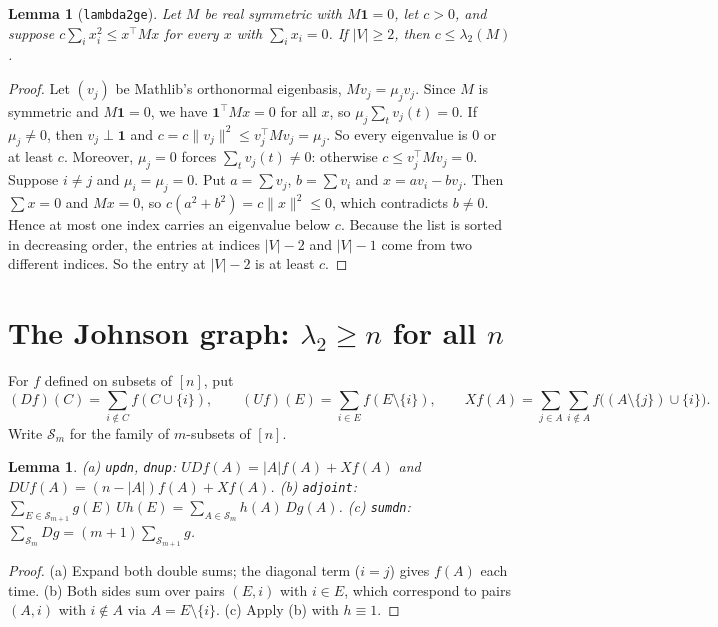 \documentclass[11pt]{article}
\newtheorem{lemma}[theorem]{Lemma}
\theoremstyle{definition}
\theoremstyle{remark}
\renewcommand{\_}{\oldus\allowbreak}
\begin{document}
\begin{lemma}[\texttt{lambda2\_ge}]\label{lem:var}
Let $M$ be real symmetric with $M\mathbf 1=0$, let $c>0$, and suppose $c\sum_i x_i^2\le x^\top Mx$ for
every $x$ with $\sum_i x_i=0$. If $|V|\ge 2$, then $c\le\lambda_2(M)$.
\end{lemma}
\begin{proof}
Let $(v_j)$ be Mathlib's orthonormal eigenbasis, $Mv_j=\mu_jv_j$. Since $M$ is symmetric and
$M\mathbf 1=0$, we have $\mathbf 1^\top Mx=0$ for all $x$, so $\mu_j\sum_t v_j(t)=0$. If $\mu_j\neq0$,
then $v_j\perp\mathbf 1$ and $c=c\|v_j\|^2\le v_j^\top Mv_j=\mu_j$. So every eigenvalue is $0$ or at
least $c$. Moreover, $\mu_j=0$ forces $\sum_t v_j(t)\ne0$: otherwise $c\le v_j^\top Mv_j=0$. Suppose
$i\ne j$ and $\mu_i=\mu_j=0$. Put $a=\sum v_j$, $b=\sum v_i$ and $x=av_i-bv_j$. Then $\sum x=0$ and
$Mx=0$, so $c(a^2+b^2)=c\|x\|^2\le0$, which contradicts $b\ne0$. Hence at most one index carries an
eigenvalue below $c$. Because the list is sorted in decreasing order, the entries at indices $|V|-2$
and $|V|-1$ come from two different indices. So the entry at $|V|-2$ is at least $c$.
\end{proof}

\section{The Johnson graph: $\lambda_2\ge n$ for all $n$}

For $f$ defined on subsets of $[n]$, put
\[(Df)(C)=\sum_{i\notin C}f(C\cup\{i\}),\qquad (Uf)(E)=\sum_{i\in E}f(E\setminus\{i\}),\qquad
X f(A)=\sum_{j\in A}\sum_{i\notin A}f\big((A\setminus\{j\})\cup\{i\}\big).\]
Write $\mathcal S_m$ for the family of $m$-subsets of $[n]$.

\begin{lemma}\label{lem:alg}
(a) \texttt{up\_dn}, \texttt{dn\_up}: $UDf(A)=|A|f(A)+Xf(A)$ and $DUf(A)=(n-|A|)f(A)+Xf(A)$.
(b) \texttt{adjoint}: $\sum_{E\in\mathcal S_{m+1}}g(E)\,Uh(E)=\sum_{A\in\mathcal S_m}h(A)\,Dg(A)$.
(c) \texttt{sum\_dn}: $\sum_{\mathcal S_m}Dg=(m+1)\sum_{\mathcal S_{m+1}}g$.
\end{lemma}
\begin{proof}
(a) Expand both double sums; the diagonal term ($i=j$) gives $f(A)$ each time. (b) Both sides sum over
pairs $(E,i)$ with $i\in E$, which correspond to pairs $(A,i)$ with $i\notin A$ via $A=E\setminus\{i\}$.
(c) Apply (b) with $h\equiv1$.
\end{proof}
\end{document}
